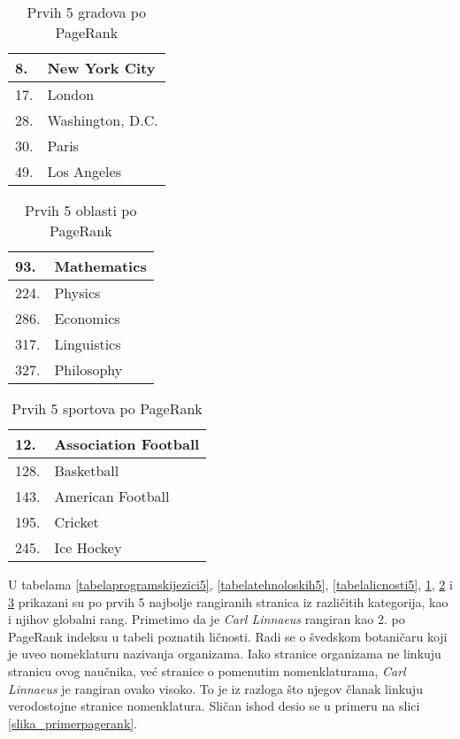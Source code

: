 \documentclass[12pt, journal, compsoc]{IEEEtran}
\begin{document}
\begin{table}[]
\large
\centering
\begin{tabular}{|l|l|}
\hline
8.                 & New York City                            \\ \hline
17.                 & London                         \\ \hline
28.                 & Washington, D.C.                \\ \hline
30.                 & Paris                     \\ \hline
49.                 & Los Angeles \\ \hline
\end{tabular}
\caption{Prvih 5 gradova po PageRank}
\label{tabelagradova5}
\end{table}

\begin{table}[]
\large
\centering
\begin{tabular}{|l|l|}
\hline
93.                 & Mathematics                            \\ \hline
224.                 & Physics                         \\ \hline
286.                 & Economics                \\ \hline
317.                 & Linguistics                     \\ \hline
327.                 & Philosophy \\ \hline
\end{tabular}
\caption{Prvih 5 oblasti po PageRank}
\label{tabelaoblasti5}
\end{table}

\begin{table}[]
\large
\centering
\begin{tabular}{|l|l|}
\hline
12.                 & Association Football                            \\ \hline
128.                 & Basketball  \\ \hline
143.  & American Football \\ \hline
195.                 & Cricket                \\ \hline
245.                 & Ice Hockey                     \\ \hline
\end{tabular}
\caption{Prvih 5 sportova po PageRank}
\label{tabelasportova5}
\end{table}



U tabelama \ref{tabelaprogramskijezici5}, \ref{tabelatehnoloskih5}, \ref{tabelalicnosti5}, \ref{tabelagradova5}, \ref{tabelaoblasti5} i \ref{tabelasportova5} prikazani su po prvih 5 najbolje rangiranih stranica iz različitih kategorija, kao i njihov globalni rang.
Primetimo da je \textit{Carl Linnaeus} rangiran kao 2. po PageRank indeksu u tabeli poznatih ličnosti. Radi se o švedskom botaničaru koji je uveo nomeklaturu nazivanja organizama. Iako stranice organizama ne linkuju stranicu ovog naučnika, već stranice o pomenutim nomenklaturama, \textit{Carl Linnaeus} je rangiran ovako visoko. To je iz razloga što njegov članak linkuju verodostojne stranice nomenklatura. Sličan ishod desio se u primeru na slici \ref{slika_primerpagerank}.
\end{document}
